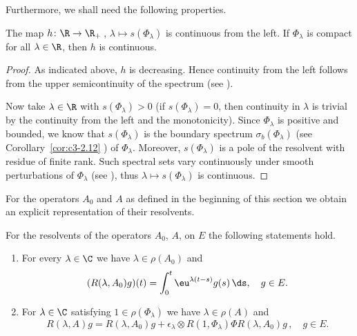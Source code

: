 Furthermore, we shall need the following properties.
\begin{lemma}\label{lem:c4-3.4}
%
The map $h \colon \R \to \R_{+}$\,, $\lambda \mapsto s(\Phi_{\lambda})$ is continuous from the left. 
If\/ $\Phi_{\lambda}$ is compact for all $\lambda \in \R$, then $h$ is continuous.
\end{lemma}
\begin{proof}
As indicated above, $h$ is decreasing. Hence continuity from the left follows from the upper semicontinuity of the spectrum (see \textcite[Chapter IV, Theorem~3.1]{kato:1976}).

Now take $\lambda \in \R$ with $s(\Phi_{\lambda}) > 0$ (if\/ $s( \Phi_{\lambda}) = 0$, then continuity in $\lambda$ is trivial by the continuity from the left and the monotonicity). Since $\Phi_{\lambda}$ is positive and bounded, we know that 
$s(\Phi_{\lambda})$ is the boundary spectrum $\sigma_b(\Phi_{\lambda})$ (see Corollary~\ref{cor:c3-2.12} ) of\/ $\Phi_{\lambda}$. Moreover, $s(\Phi_{\lambda})$ is a pole of the resolvent with residue of finite rank. Such spectral sets vary continuously under smooth perturbations of\/ $\Phi_{\lambda}$ (see \textcite[VII.6, Theorem 9]{dunfordschwartz:1958}), thus $\lambda \mapsto s(\Phi_{\lambda})$ is continuous.
\end{proof}
For the operators $A_{0}$ and $A$ as defined in the beginning of this section we obtain an explicit representation of their resolvents.
\begin{lemma}\label{lem:c4-3.5}
For the resolvents of the operators $A_{0}$, \resp $A$, on $E$ the following statements hold.
\begin{enumerate}[\upshape (i)]
\item \label{lem:c4-3.5-1}
For every $\lambda \in \C$ we have $\lambda \in \rho(A_{0})$ and
\begin{equation}\label{eq:c4-3.7}
(R(\lambda,A_{0})g)(t) = \int_{0}^{t} \eu^{\lambda(t-s)}g(s)\, \ds, \quad g \in E.
\end{equation}
\item \label{lem:c4-3.5-2}
For $\lambda \in \C$ satisfying $1 \in \rho(\Phi_{\lambda})$ we have $\lambda \in \rho(A)$ and
\begin{equation}\label{eq:c4-3.8}
R(\lambda,A)g = R(\lambda,A_{0})g + \epsilon_{\lambda} \otimes R(1,\Phi_{\lambda})\Phi R(\lambda,A_{0})g\,, \quad g \in E.
\end{equation}
\end{enumerate}
\end{lemma}
